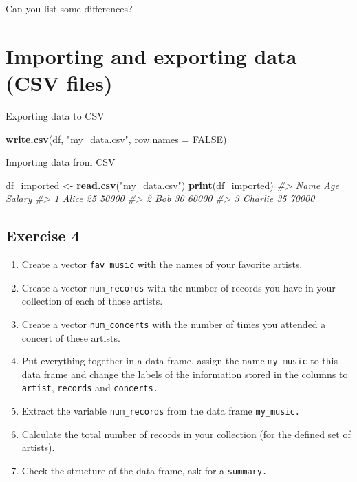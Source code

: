 \documentclass[
]{book}
\newenvironment{Shaded}{\begin{snugshade}}{\end{snugshade}}
\newcommand{\AttributeTok}[1]{\textcolor[rgb]{0.13,0.29,0.53}{#1}}
\newcommand{\CommentTok}[1]{\textcolor[rgb]{0.56,0.35,0.01}{\textit{#1}}}
\newcommand{\ConstantTok}[1]{\textcolor[rgb]{0.56,0.35,0.01}{#1}}
\newcommand{\FunctionTok}[1]{\textcolor[rgb]{0.13,0.29,0.53}{\textbf{#1}}}
\newcommand{\NormalTok}[1]{#1}
\newcommand{\OtherTok}[1]{\textcolor[rgb]{0.56,0.35,0.01}{#1}}
\newcommand{\StringTok}[1]{\textcolor[rgb]{0.31,0.60,0.02}{#1}}
\providecommand{\tightlist}{%
  \setlength{\itemsep}{0pt}\setlength{\parskip}{0pt}}
\begin{document}
Can you list some differences?

\section*{Importing and exporting data (CSV files)}\label{importing-and-exporting-data-csv-files}

Exporting data to CSV

\begin{Shaded}
\begin{Highlighting}[]
\FunctionTok{write.csv}\NormalTok{(df, }\StringTok{"my\_data.csv"}\NormalTok{, }\AttributeTok{row.names =} \ConstantTok{FALSE}\NormalTok{)}
\end{Highlighting}
\end{Shaded}

Importing data from CSV

\begin{Shaded}
\begin{Highlighting}[]
\NormalTok{df\_imported }\OtherTok{\textless{}{-}} \FunctionTok{read.csv}\NormalTok{(}\StringTok{"my\_data.csv"}\NormalTok{)}
\FunctionTok{print}\NormalTok{(df\_imported)}
\CommentTok{\#\textgreater{}      Name Age Salary}
\CommentTok{\#\textgreater{} 1   Alice  25  50000}
\CommentTok{\#\textgreater{} 2     Bob  30  60000}
\CommentTok{\#\textgreater{} 3 Charlie  35  70000}
\end{Highlighting}
\end{Shaded}

\subsection*{Exercise 4}\label{exercise-4}

\begin{enumerate}
\def\labelenumi{\arabic{enumi}.}
\tightlist
\item
  Create a vector \texttt{fav\_music} with the names of your favorite artists.
\item
  Create a vector \texttt{num\_records} with the number of records you have in
  your collection of each of those artists.
\item
  Create a vector \texttt{num\_concerts} with the number of times you attended a concert of these artists.
\item
  Put everything together in a data frame, assign the name \texttt{my\_music} to this data frame and change the labels of the information stored in the columns to \texttt{artist}, \texttt{records} and \texttt{concerts.}
\item
  Extract the variable \texttt{num\_records} from the data frame \texttt{my\_music.}
\item
  Calculate the total number of records in your collection (for the defined
  set of artists).
\item
  Check the structure of the data frame, ask for a \texttt{summary.}
\end{enumerate}
\end{document}
